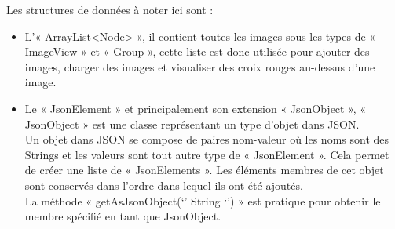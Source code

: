\documentclass[a4paper]{article}
\begin{document}
\begin{enumerate}
    Les structures de données à noter ici sont :
    
    \begin{itemize}
        \item L’« ArrayList<Node> », il contient toutes les images sous les types de « ImageView » et « Group », cette liste est donc utilisée pour ajouter des images, charger des images et visualiser des croix rouges au-dessus d'une image.
        \item Le « JsonElement » et principalement son extension « JsonObject », « JsonObject » est une classe représentant un type d'objet dans JSON.\\
        Un objet dans JSON se compose de paires nom-valeur où les noms sont des Strings et les valeurs sont tout autre type de « JsonElement ». Cela permet de créer une liste de « JsonElements ». Les éléments membres de cet objet sont conservés dans l'ordre dans lequel ils ont été ajoutés.\\
        La méthode « getAsJsonObject(‘’ String ‘’) » est pratique pour obtenir le membre spécifié en tant que JsonObject.\\
    \end{itemize}
 


\end{enumerate}
\end{document}
